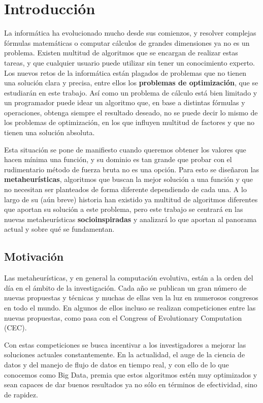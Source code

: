 \chapter{Introducción}

La informática ha evolucionado mucho desde sus comienzos, y resolver complejas fórmulas matemáticas o computar cálculos de grandes dimensiones ya no es un problema. Existen multitud de algoritmos que se encargan de realizar estas tareas, y que cualquier usuario puede utilizar sin tener un conocimiento experto. Los nuevos retos de la informática están plagados de problemas que no tienen una solución clara y precisa, entre ellos los \textbf{problemas de optimización}, que se estudiarán en este trabajo. Así como un problema de cálculo está bien limitado y un programador puede idear un algoritmo que, en base a distintas fórmulas y operaciones, obtenga siempre el resultado deseado, no se puede decir lo mismo de los problemas de optimización, en los que influyen multitud de factores y que no tienen una solución absoluta.

Esta situación se pone de manifiesto cuando queremos obtener los valores que hacen mínima una función, y su dominio es tan grande que probar con el rudimentario método de fuerza bruta no es una opción. Para esto se diseñaron las \textbf{metaheurísticas}, algoritmos que buscan la mejor solución a una función y que no necesitan ser planteados de forma diferente dependiendo de cada una. A lo largo de su (aún breve) historia han existido ya multitud de algoritmos diferentes que aportan su solución a este problema, pero este trabajo se centrará en las nuevas metaheurísticas \textbf{socioinspiradas} y analizará lo que aportan al panorama actual y sobre qué se fundamentan.

\section{Motivación}

Las metaheurísticas, y en general la computación evolutiva, están a la orden del día en el ámbito de la investigación. Cada año se publican un gran número de nuevas propuestas y técnicas y muchas de ellas ven la luz en numerosos congresos en todo el mundo. En algunos de ellos incluso se realizan competiciones entre las nuevas propuestas, como pasa con el Congress of Evolutionary Computation (CEC).

Con estas competiciones se busca incentivar a los investigadores a mejorar las soluciones actuales constantemente. En la actualidad, el auge de la ciencia de datos y del manejo de flujo de datos en tiempo real, y con ello de lo que conocemos como Big Data, premia que estos algoritmos estén muy optimizados y sean capaces de dar buenos resultados ya no sólo en términos de efectividad, sino de rapidez.

